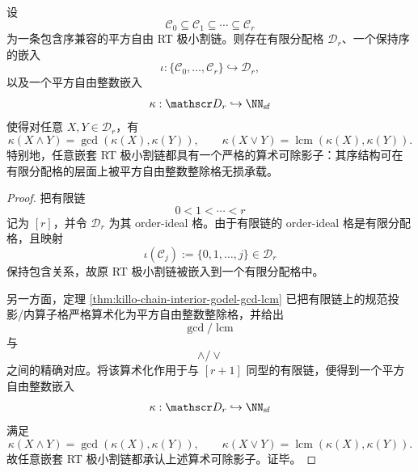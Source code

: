 \begin{theorem}[嵌套 RT 极小割的算术可除化]\label{thm:conclusion-screen-rt-chain-arithmetic-divisor-shadow}
设
\[
\mathcal C_0\subseteq \mathcal C_1\subseteq \cdots \subseteq \mathcal C_r
\]
为一条包含序兼容的平方自由 RT 极小割链。则存在有限分配格 \(\mathscr D_r\)、一个保持序的嵌入
\[
\iota:\{\mathcal C_0,\dots,\mathcal C_r\}\hookrightarrow \mathscr D_r,
\]
以及一个平方自由整数嵌入
\[
\kappa:\mathscr D_r\hookrightarrow \NN_{\mathrm{sf}}
\]
使得对任意 \(X,Y\in \mathscr D_r\)，有
\[
\kappa(X\wedge Y)=\gcd(\kappa(X),\kappa(Y)),
\qquad
\kappa(X\vee Y)=\operatorname{lcm}(\kappa(X),\kappa(Y)).
\]
特别地，任意嵌套 RT 极小割链都具有一个严格的算术可除影子：其序结构可在有限分配格的层面上被平方自由整数整除格无损承载。
\end{theorem}
\begin{proof}
把有限链
\[
0<1<\cdots<r
\]
记为 \([r]\)，并令 \(\mathscr D_r\) 为其 order-ideal 格。由于有限链的 order-ideal 格是有限分配格，且映射
\[
\iota(\mathcal C_j):=\{0,1,\dots,j\}\in \mathscr D_r
\]
保持包含关系，故原 RT 极小割链被嵌入到一个有限分配格中。

另一方面，定理 \ref{thm:killo-chain-interior-godel-gcd-lcm} 已把有限链上的规范投影/内算子格严格算术化为平方自由整数整除格，并给出
\[
\gcd/\operatorname{lcm}
\]
与
\[
\wedge/\vee
\]
之间的精确对应。将该算术化作用于与 \([r+1]\) 同型的有限链，便得到一个平方自由整数嵌入
\[
\kappa:\mathscr D_r\hookrightarrow \NN_{\mathrm{sf}}
\]
满足
\[
\kappa(X\wedge Y)=\gcd(\kappa(X),\kappa(Y)),
\qquad
\kappa(X\vee Y)=\operatorname{lcm}(\kappa(X),\kappa(Y)).
\]
故任意嵌套 RT 极小割链都承认上述算术可除影子。证毕。
\end{proof}

